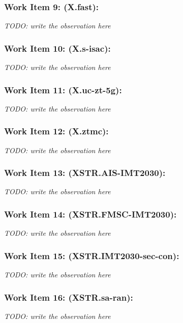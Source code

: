 \subsubsection{Work Item 9: (X.fast):}

\textit{TODO: write the observation here}

\subsubsection{Work Item 10: (X.s-isac):}

\textit{TODO: write the observation here}

\subsubsection{Work Item 11: (X.uc-zt-5g):}

\textit{TODO: write the observation here}

\subsubsection{Work Item 12: (X.ztmc):}

\textit{TODO: write the observation here}

\subsubsection{Work Item 13: (XSTR.AIS-IMT2030):}

\textit{TODO: write the observation here}

\subsubsection{Work Item 14: (XSTR.FMSC-IMT2030):}

\textit{TODO: write the observation here}

\subsubsection{Work Item 15: (XSTR.IMT2030-sec-con):}

\textit{TODO: write the observation here}

\subsubsection{Work Item 16: (XSTR.sa-ran):}

\textit{TODO: write the observation here}


